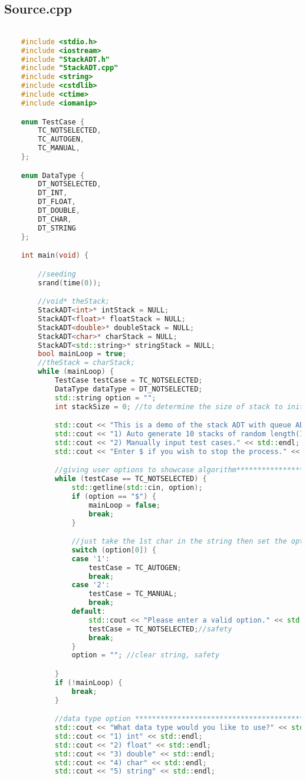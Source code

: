\documentclass{report}
\begin{document}
\subsection{Source.cpp}
\begin{lstlisting}[language=C++]

	#include <stdio.h>
	#include <iostream>
	#include "StackADT.h"
	#include "StackADT.cpp"
	#include <string>
	#include <cstdlib>
	#include <ctime>
	#include <iomanip>

	enum TestCase {
		TC_NOTSELECTED,
		TC_AUTOGEN,
		TC_MANUAL,
	};

	enum DataType {
		DT_NOTSELECTED,
		DT_INT,
		DT_FLOAT,
		DT_DOUBLE,
		DT_CHAR,
		DT_STRING
	};

	int main(void) {

		//seeding
		srand(time(0));

		//void* theStack;
		StackADT<int>* intStack = NULL;
		StackADT<float>* floatStack = NULL;
		StackADT<double>* doubleStack = NULL;
		StackADT<char>* charStack = NULL;
		StackADT<std::string>* stringStack = NULL;
		bool mainLoop = true;
		//theStack = charStack;
		while (mainLoop) {
			TestCase testCase = TC_NOTSELECTED;
			DataType dataType = DT_NOTSELECTED;
			std::string option = "";
			int stackSize = 0; //to determine the size of stack to init

			std::cout << "This is a demo of the stack ADT with queue ADT as the base. What would you like to do?" << std::endl;
			std::cout << "1) Auto generate 10 stacks of random length(1-10), random amount of data(1-10) and data." << std::endl;
			std::cout << "2) Manually input test cases." << std::endl;
			std::cout << "Enter $ if you wish to stop the process." << std::endl;

			//giving user options to showcase algorithm*************************************
			while (testCase == TC_NOTSELECTED) {
				std::getline(std::cin, option);
				if (option == "$") {
					mainLoop = false;
					break;
				}

				//just take the 1st char in the string then set the option
				switch (option[0]) {
				case '1':
					testCase = TC_AUTOGEN;
					break;
				case '2':
					testCase = TC_MANUAL;
					break;
				default:
					std::cout << "Please enter a valid option." << std::endl;
					testCase = TC_NOTSELECTED;//safety
					break;
				}
				option = ""; //clear string, safety

			}
			if (!mainLoop) {
				break;
			}

			//data type option ****************************************************************
			std::cout << "What data type would you like to use?" << std::endl;
			std::cout << "1) int" << std::endl;
			std::cout << "2) float" << std::endl;
			std::cout << "3) double" << std::endl;
			std::cout << "4) char" << std::endl;
			std::cout << "5) string" << std::endl;


\end{lstlisting}
\end{document}
